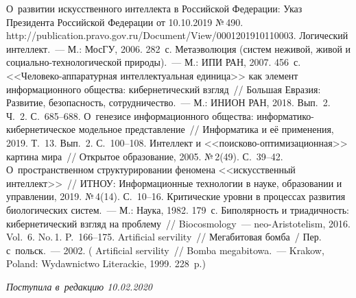 \begin{multicols}{2}
{{\begin{thebibliography}{99}
О~развитии искусственного 
интеллекта в Российской Федерации: Указ Президента Российской Федерации от 
10.10.2019 №\,490. {\sf 
http://publication.\linebreak pravo.gov.ru/Document/View/0001201910110003}.
 Логический интеллект.~--- М.: МосГУ, 2006. 282~с.
 Метаэволюция (систем неживой, живой и социально-технологической 
природы).~--- М.: ИПИ РАН, 2007. 456~с.
 <<Че\-ло\-ве\-ко-ап\-па\-ра\-тур\-ная интеллектуальная единица>> как 
элемент информационного общества: кибернетический взгляд~// Большая Евразия: Развитие, 
безопасность, сотрудничество.~--- М.: ИНИОН РАН, 2018. Вып.~2. Ч.~2. С.~685--688.
 О~генезисе информационного общества:  
ин\-фор\-ма\-ти\-ко-ки\-бер\-не\-ти\-че\-ское модельное представление~// Информатика и её 
применения, 2019. Т.~13. Вып.~2. С.~100--108.
 Интеллект и <<поиско\-во-оп\-ти\-ми\-за\-ци\-он\-ная>> картина 
мира~// Открытое образование, 2005. №\,2(49). С.~39--42.
 О~пространственном структурировании феномена <<искусственный 
интеллект>>~// \mbox{ИТНОУ}: Информационные технологии в науке, образовании и управлении, 
2019. №\,4(14). С.~10--16.
 Критические уровни в процессах развития 
биологических сис\-тем.~--- М.: Наука, 1982. 179~с.
 Биполярность и триадичность: кибернетический взгляд на проблему~// 
Biocosmology~--- neo-Aristotelism, 2016. Vol.~6. No.\,1. P.~166--175.
 Artificial servility~// Мегабитовая бомба~/
Пер. с~польск.~--- 2002.
( Artificial servility~// Bomba megabitowa.~--- 
Krakow, Poland: Wydawnictwo Literackie, 1999. 228~p.) 

\end{thebibliography}

}
}

\end{multicols}

\vspace*{-8pt}

\hfill{\small\textit{Поступила в~редакцию 10.02.2020}}



